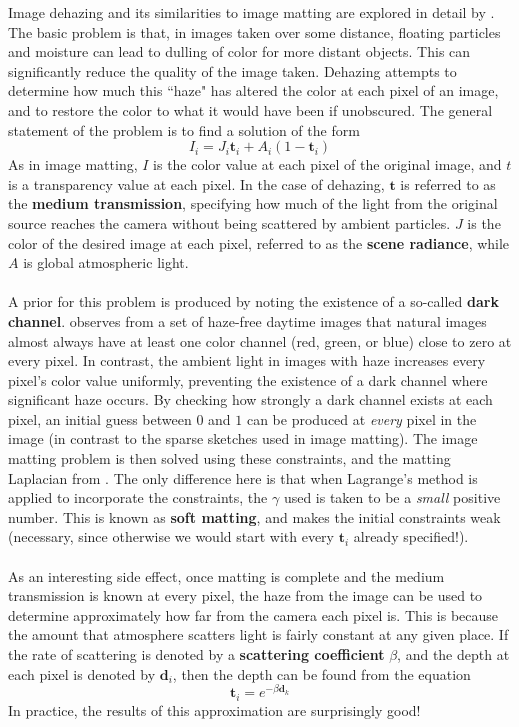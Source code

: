 Image dehazing and its similarities to image matting are explored in detail by \cite{he11}. The basic problem is that, in images taken over some distance, floating particles and moisture can lead to dulling of color for more distant objects. This can significantly reduce the quality of the image taken. Dehazing attempts to determine how much this ``haze" has altered the color at each pixel of an image, and to restore the color to what it would have been if unobscured. The general statement of the problem is to find a solution of the form
\[I_i = J_i\textbf{t}_i+A_i(1-\textbf{t}_i)\]
As in image matting, $I$ is the color value at each pixel of the original image, and $t$ is a transparency value at each pixel. In the case of dehazing, $\textbf{t}$ is referred to as the \textbf{medium transmission}, specifying how much of the light from the original source reaches the camera without being scattered by ambient particles. $J$ is the color of the desired image at each pixel, referred to as the \textbf{scene radiance}, while $A$ is global atmospheric light.
\\\\
A prior for this problem is produced by noting the existence of a so-called \textbf{dark channel}. \cite{he11} observes from a set of haze-free daytime images that natural images almost always have at least one color channel (red, green, or blue) close to zero at every pixel. In contrast, the ambient light in images with haze increases every pixel's color value uniformly, preventing the existence of a dark channel where significant haze occurs. By checking how strongly a dark channel exists at each pixel, an initial guess between $0$ and $1$ can be produced at \textit{every} pixel in the image (in contrast to the sparse sketches used in image matting). The image matting problem is then solved using these constraints, and the matting Laplacian from \cite{levin08}. The only difference here is that when Lagrange's method is applied to incorporate the constraints, the $\gamma$ used is taken to be a \textit{small} positive number. This is known as \textbf{soft matting}, and makes the initial constraints weak (necessary, since otherwise we would start with every $\textbf{t}_i$ already specified!).
\\\\
As an interesting side effect, once matting is complete and the medium transmission is known at every pixel, the haze from the image can be used to determine approximately how far from the camera each pixel is. This is because the amount that atmosphere scatters light is fairly constant at any given place. If the rate of scattering is denoted by a \textbf{scattering coefficient} $\beta$, and the depth at each pixel is denoted by $\textbf{d}_i$, then the depth can be found from the equation
\[\textbf{t}_i=e^{-\beta \textbf{d}_k}\]
In practice, the results of this approximation are surprisingly good!